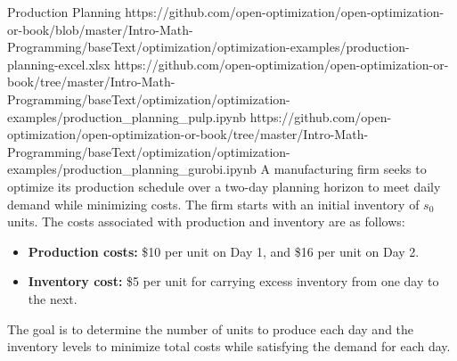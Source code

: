 \begin{examplewithallcode}{Production Planning}
{https://github.com/open-optimization/open-optimization-or-book/blob/master/Intro-Math-Programming/baseText/optimization/optimization-examples/production-planning-excel.xlsx}
{https://github.com/open-optimization/open-optimization-or-book/tree/master/Intro-Math-Programming/baseText/optimization/optimization-examples/production_planning_pulp.ipynb}
{https://github.com/open-optimization/open-optimization-or-book/tree/master/Intro-Math-Programming/baseText/optimization/optimization-examples/production_planning_gurobi.ipynb}
\label{example:production-planning}
A manufacturing firm seeks to optimize its production schedule over a two-day planning horizon to meet daily demand while minimizing costs. The firm starts with an initial inventory of \( s_0 \) units. The costs associated with production and inventory are as follows:

\begin{itemize}
    \item \textbf{Production costs:} \$10 per unit on Day 1, and \$16 per unit on Day 2.
    \item \textbf{Inventory cost:} \$5 per unit for carrying excess inventory from one day to the next.
\end{itemize}

\par{}\label{fig:modeling-linear-programming-tikz01}%


The goal is to determine the number of units to produce each day and the inventory levels to minimize total costs while satisfying the demand for each day.

\end{examplewithallcode}

